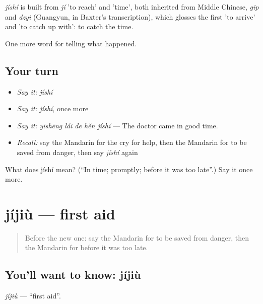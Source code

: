 \begin{cousinweb}
\emph{jíshí} is built from \emph{jí} 'to reach' and  'time', both inherited from Middle Chinese, \emph{gip} and \emph{dzyi} (Guangyun, in Baxter's transcription), which glosses the first 'to arrive' and 'to catch up with': to catch the time.
\end{cousinweb}

\begin{grammarlens}[title={What you've built}]
One more word for telling what happened.
\end{grammarlens}

\subsection*{Your turn}
\begin{itemize}
\raggedright
  \item \emph{Say it:} \emph{jíshí}
  \item \emph{Say it:} \emph{jíshí}, once more
  \item \emph{Say it:} \emph{yīshēng lái de hěn jíshí} — The doctor came in good time.
  \item \emph{Recall:} say the Mandarin for the cry for help, then the Mandarin for to be saved from danger, then say \emph{jíshí} again
\end{itemize}

\begin{tcolorbox}[breakable,colback=teal!4,colframe=teal!35!black,title={Before you move on}]
What does jíshí mean? (\textquotedblleft{}In time; promptly; before it was too late\textquotedblright{}.) Say it once more.
\end{tcolorbox}
\section[jíjiù]{jíjiù — first aid}

\label{lesson:ZH-C299-jijiu}



\begin{quote}
Before the new one: say the Mandarin for to be saved from danger, then the Mandarin for before it was too late.
\end{quote}

\subsection*{You'll want to know: jíjiù}
\emph{jíjiù} — \textquotedblleft{}first aid\textquotedblright{}.

